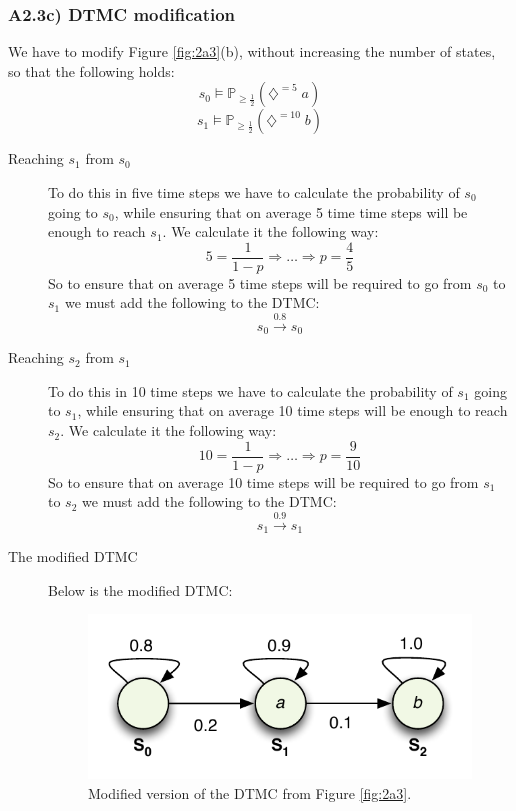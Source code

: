 \documentclass[12pt]{report}
\begin{document}
\subsubsection*{A2.3c) DTMC modification}
We have to modify Figure \ref{fig:2a3}(b), without increasing the number of states, so that the following holds:
$$s_0 \models \mathbb{P}_{\geq \frac{1}{2}}(\diamondsuit^{=5}\; a)$$
$$s_1 \models \mathbb{P}_{\geq \frac{1}{2}}(\diamondsuit^{=10}\; b)$$

\begin{description}
	\item[Reaching $s_1$ from $s_0$] To do this in five time steps we have to calculate the probability of $s_0$ going to $s_0$, while ensuring that on average 5 time time steps will be enough to reach $s_1$. We calculate it the following way:
	$$5 = \frac{1}{1-p} \Rightarrow \ldots \Rightarrow p = \frac{4}{5}$$
	So to ensure that on average 5 time steps will be required to go from $s_0$ to $s_1$ we must add the following to the DTMC:
	$$s_0 \xrightarrow{0.8} s_0$$
	
	\item[Reaching $s_2$ from $s_1$] To do this in 10 time steps we have to calculate the probability of $s_1$ going to $s_1$, while ensuring that on average 10 time steps will be enough to reach $s_2$. We calculate it the following way:
	$$10 = \frac{1}{1-p} \Rightarrow \ldots \Rightarrow p = \frac{9}{10}$$
	So to ensure that on average 10 time steps will be required to go from $s_1$ to $s_2$ we must add the following to the DTMC:
	$$s_1 \xrightarrow{0.9} s_1$$
	
	\item[The modified DTMC] Below is the modified DTMC:
	\begin{figure}[H]
		\begin{center}
		\includegraphics[scale=.85]{../GFX/Answer-A2-3c.pdf}
		\end{center}
		\caption{Modified version of the DTMC from Figure \ref{fig:2a3}.}
	\end{figure}
\end{description}
\end{document}
